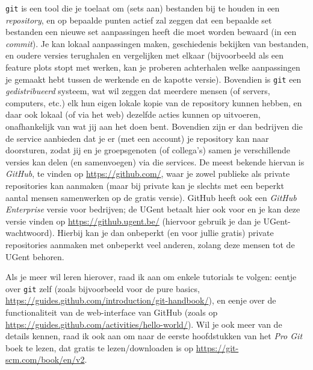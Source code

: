 \documentclass[a4paper,twoside,openany]{memoir}
\begin{document}
\verb!git! is een tool die je toelaat om (sets aan) bestanden bij te houden in
een \emph{repository}, en op bepaalde punten actief zal zeggen dat een bepaalde
set bestanden een nieuwe set aanpassingen heeft die moet worden bewaard (in een
\emph{commit}). Je kan lokaal aanpassingen maken, geschiedenis bekijken van
bestanden, en oudere versies terughalen en vergelijken met elkaar (bijvoorbeeld
als een feature plots stopt met werken, kan je proberen achterhalen welke
aanpassingen je gemaakt hebt tussen de werkende en de kapotte versie).
Bovendien is \verb!git! een \emph{gedistribueerd} systeem, wat wil zeggen dat
meerdere mensen (of servers, computers, etc.) elk hun eigen lokale kopie van de
repository kunnen hebben, en daar ook lokaal (of via het web) dezelfde acties
kunnen op uitvoeren, onafhankelijk van wat jij aan het doen bent. Bovendien
zijn er dan bedrijven die de service aanbieden dat je er (met een account) je
repository kan naar doorsturen, zodat jij en je groepsgenoten (of collega's)
samen je verschillende versies kan delen (en samenvoegen) via die services. De
meest bekende hiervan is \emph{GitHub}, te vinden op \url{https://github.com/},
waar je zowel publieke als private repositories kan aanmaken (maar bij private
kan je slechts met een beperkt aantal mensen samenwerken op de gratis versie).
GitHub heeft ook een \emph{GitHub Enterprise} versie voor bedrijven; de UGent
betaalt hier ook voor en je kan deze versie vinden op
\url{https://github.ugent.be/} (hiervoor gebruik je dan je UGent-wachtwoord).
Hierbij kan je dan onbeperkt (en voor jullie
gratis) private repositories aanmaken met onbeperkt veel anderen, zolang deze
mensen tot de UGent behoren.

Als je meer wil leren hierover, raad ik aan om enkele tutorials te volgen:
eentje over \verb!git! zelf (zoals bijvoorbeeld voor de pure basics,
\url{https://guides.github.com/introduction/git-handbook/}), en eenje over de
functionaliteit van de web-interface van GitHub (zoals op
\url{https://guides.github.com/activities/hello-world/}). Wil je ook meer van de
details kennen, raad ik ook aan om naar de eerste hoofdstukken van het
\emph{Pro Git} boek te lezen, dat gratis te lezen/downloaden is op
\url{https://git-scm.com/book/en/v2}.
\end{document}
